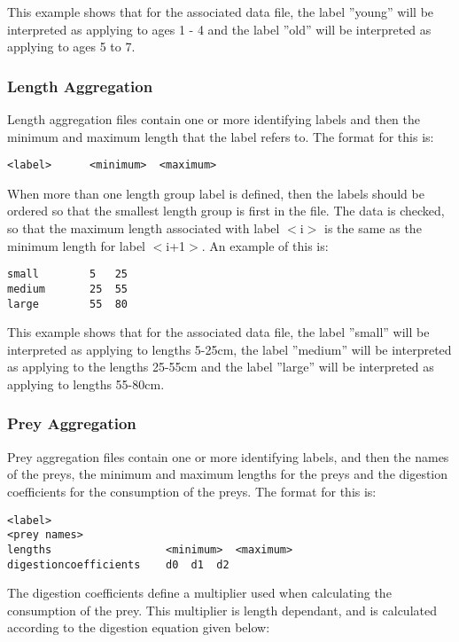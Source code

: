 \documentclass[10pt,twoside]{book}
\begin{document}
This example shows that for the associated data file, the label ''young'' will be interpreted as applying to ages 1 - 4 and the label ''old'' will be interpreted as applying to ages 5 to 7.

\subsubsection{Length Aggregation}
Length aggregation files contain one or more identifying labels and then the minimum and maximum length that the label refers to.  The format for this is:

{\small\begin{verbatim}
<label>      <minimum>  <maximum>
\end{verbatim}}

When more than one length group label is defined, then the labels should be ordered so that the smallest length group is first in the file.  The data is checked, so that the maximum length associated with label $<$i$>$ is the same as the minimum length for label $<$i+1$>$.  An example of this is:

{\small\begin{verbatim}
small        5   25
medium       25  55
large        55  80
\end{verbatim}}

This example shows that for the associated data file, the label ''small'' will be interpreted as applying to lengths 5-25cm, the label ''medium'' will be interpreted as applying to the lengths 25-55cm and the label ''large'' will be interpreted as applying to lengths 55-80cm.

\subsubsection{Prey Aggregation}
Prey aggregation files contain one or more identifying labels, and then the names of the preys, the minimum and maximum lengths for the preys and the digestion coefficients for the consumption of the preys.  The format for this is:

{\small\begin{verbatim}
<label>
<prey names>
lengths                  <minimum>  <maximum>
digestioncoefficients    d0  d1  d2
\end{verbatim}}

The digestion coefficients define a multiplier used when calculating the consumption of the prey.  This multiplier is length dependant, and is calculated according to the digestion equation given below:
\end{document}
